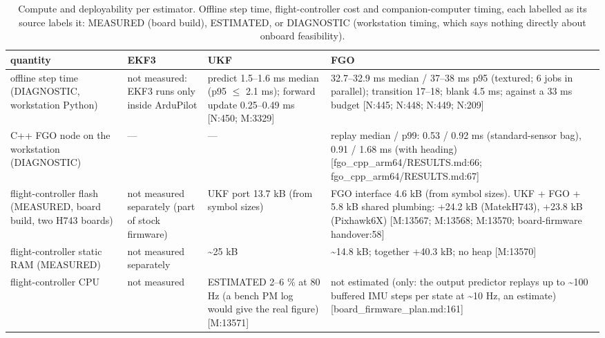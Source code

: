\begin{table}[htbp]
\centering
\scriptsize
\caption{Compute and deployability per estimator. Offline step time, flight-controller cost and companion-computer timing, each labelled as its source labels it: MEASURED (board build), ESTIMATED, or DIAGNOSTIC (workstation timing, which says nothing directly about onboard feasibility).}
\label{tab:realflight_compute}
\begin{tabular}{p{}p{}p{}p{}}
\toprule
\textbf{quantity} & \textbf{EKF3} & \textbf{UKF} & \textbf{FGO} \\
\midrule
offline step time (DIAGNOSTIC, workstation Python) & not measured: EKF3 runs only inside ArduPilot & predict 1.5--1.6 ms median (p95 $\le$ 2.1 ms); forward update 0.25--0.49 ms [N:450; M:3329] & 32.7--32.9 ms median / 37--38 ms p95 (textured; 6 jobs in parallel); transition 17--18; blank 4.5 ms; against a 33 ms budget [N:445; N:448; N:449; N:209] \\
C++ FGO node on the workstation (DIAGNOSTIC) & --- & --- & replay median / p99: 0.53 / 0.92 ms (standard-sensor bag), 0.91 / 1.68 ms (with heading) [fgo\_cpp\_arm64/RESULTS.md:66; fgo\_cpp\_arm64/RESULTS.md:67] \\
flight-controller flash (MEASURED, board build, two H743 boards) & not measured separately (part of stock firmware) & UKF port 13.7 kB (from symbol sizes) & FGO interface 4.6 kB (from symbol sizes). UKF + FGO + 5.8 kB shared plumbing: +24.2 kB (MatekH743), +23.8 kB (Pixhawk6X) [M:13567; M:13568; M:13570; board-firmware handover:58] \\
flight-controller static RAM (MEASURED) & not measured separately & \textasciitilde{}25 kB & \textasciitilde{}14.8 kB; together +40.3 kB; no heap [M:13570] \\
flight-controller CPU & not measured & ESTIMATED 2--6 \% at 80 Hz (a bench PM log would give the real figure) [M:13571] & not estimated (only: the output predictor replays up to \textasciitilde{}100 buffered IMU steps per state at \textasciitilde{}10 Hz, an estimate) [board\_firmware\_plan.md:161] \\

\end{tabular}
\end{table}
